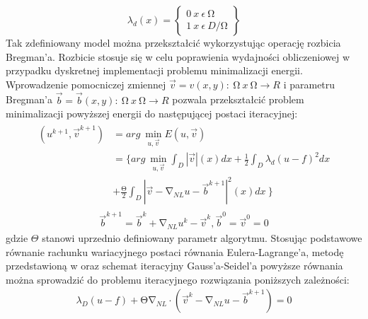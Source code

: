 \documentclass[12pt, twoside, openany]{report}
\theoremstyle{definition}
\begin{document}
\begin{equation}
{\lambda }_d\left(x\right)=\left\{ \begin{array}{c}
0\ x\ \epsilon \ \mathrm{\Omega } \\ 
1\ x\ \epsilon \ D/\mathrm{\Omega } \end{array}
\right\}
\end{equation}
Tak zdefiniowany model można przekształcić wykorzystując operację rozbicia Bregman’a. Rozbicie stosuje się w celu poprawienia wydajności obliczeniowej w przypadku dyskretnej implementacji problemu minimalizacji energii. Wprowadzenie pomocniczej zmiennej $\overrightarrow{v}=v\left(x,y\right):\ \mathrm{\Omega }\mathrm{\ }x\ \mathrm{\Omega }\longrightarrow R$ i parametru Bregman’a $\overrightarrow{b}=\overrightarrow{b}\left(x,y\right):\ \mathrm{\Omega }\mathrm{\ }x\ \mathrm{\Omega }\longrightarrow R$ pozwala przekształcić problem minimalizacji powyższej energii do następującej postaci iteracyjnej:
\begin{align}
\begin{aligned}
\left(u^{k+1},{\overrightarrow{v}}^{k+1}\right) &= arg\ \mathop{\mathrm{min}}_{u,\overrightarrow{v}} E\left(u,\overrightarrow{v}\right)\\ 
&= \biggl\{arg\ \mathop{\mathrm{min}}_{u,\overrightarrow{v}}
\int_D{|\overrightarrow{v}|\left(x\right)}dx+\frac{1}{2}\int_D{{\lambda }_d{\left(u-f\right)}^2}dx \\
&+  \frac{\mathrm{\Theta }}{2}\int_D{{\left|\overrightarrow{v}-{\mathrm{\nabla }}_{NL}u-{\overrightarrow{b}}^{k+1}\right|}^2(x)}dx\ \biggr\}
\end{aligned}
\label{NLTVGRAYMINPROB}
\end{align}
\begin{align}
{\overrightarrow{b}}^{k+1}={\overrightarrow{b}}^k+{\mathrm{\nabla }}_{NL}u^k-{\overrightarrow{v}}^k, {\overrightarrow{b}}^0={\overrightarrow{v}}^0=0
\label{BREGMANVARIABLE}
\end{align}
gdzie $\Theta$ stanowi uprzednio definiowany parametr algorytmu. Stosując podstawowe równanie rachunku wariacyjnego postaci równania Eulera-Lagrange’a, metodę przedstawioną w \cite{tai2011fast} oraz schemat iteracyjny Gauss’a-Seidel’a powyższe równania można sprowadzić do problemu iteracyjnego rozwiązania poniższych zależności:
\begin{align}
{\lambda }_D\left(u-f\right)+\mathrm{\Theta }{\mathrm{\nabla }}_{NL}\cdot \left({\overrightarrow{v}}^k-{\mathrm{\nabla }}_{NL}u-{\overrightarrow{b}}^{k+1}\right)=0
\label{ELNLTV1}
\end{align}
\end{document}
